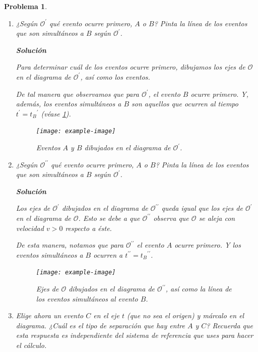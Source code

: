 \documentclass[12pt]{article}
\theoremstyle{break}
\newtheorem{exercise}{Problema}
\theoremstyle{nonumberbreak}
\newcommand*{\observer}{\mathcal{O}}
\newcommand*{\primeobserver}{\mathcal{O}^{\prime}}
\newcommand*{\biprimeobserver}{\mathcal{O}^{\prime\prime}}
\newcommand*{\inlinesol}{\vspace*{10pt}\textbf{Solución}\vspace*{10pt}}
\begin{document}
\begin{exercise}
\begin{enumerate}[label = \alph*)]
            \item ¿Según \(\primeobserver\) qué evento ocurre primero, \(A\) o \(B\)? Pinta la línea de los eventos que son simultáneos a \(B\) según \(\primeobserver\).
            
            \inlinesol

            Para determinar cuál de los eventos ocurre primero, dibujamos los ejes de \(\observer\) en el diagrama de \(\primeobserver\), así como los eventos.

            De tal manera que observamos que para \(\primeobserver\), el evento \(B\) ocurre primero. Y, además, los eventos simultáneos a \(B\) son aquellos que ocurren al tiempo \(t^{\prime} = {t_{B}}^{\prime}\) (véase \cref{fig:ABInOPrime}).

            \begin{figure}[htb]
                \centering
                \texttt{[image: example-image]}
                \caption{Eventos \(A\) y \(B\) dibujados en el diagrama de \(\primeobserver\).}
                \label{fig:ABInOPrime}
            \end{figure}

            \item ¿Según \(\biprimeobserver\) qué evento ocurre primero, \(A\) o \(B\)? Pinta la línea de los eventos que son simultáneos a \(B\) según \(\primeobserver\).
            
            \inlinesol

            Los ejes de \(\primeobserver\) dibujados en el diagrama de \(\biprimeobserver\) queda igual que los ejes de \(\primeobserver\) en el diagrama de \(\observer\). Esto se debe a que \(\biprimeobserver\) observa que \(\observer\) se aleja con velocidad \(v > 0\) respecto a éste.
            
            De esta manera, notamos que para \(\biprimeobserver\) el evento \(A\) ocurre primero. Y los eventos simultáneos a \(B\) ocurren a \(t^{\prime\prime} = {t_{B}}^{\prime\prime}\).

            \begin{figure}[htb]
                \centering
                \texttt{[image: example-image]}
                \caption{Ejes de \(\observer\) dibujados en el diagrama de \(\biprimeobserver\), así como la línea de los eventos simultáneos al evento \(B\).}
                \label{fig:OInOPrimePrime}
            \end{figure}

            \item Elige ahora un evento \(C\) en el eje \(t\) (que no sea el origen) y márcalo en el diagrama. ¿Cuál es el tipo de separación que hay entre \(A\) y \(C\)? Recuerda que esta respuesta es independiente del sistema de referencia que uses para hacer el cálculo.
            

\end{enumerate}
\end{exercise}
\end{document}
